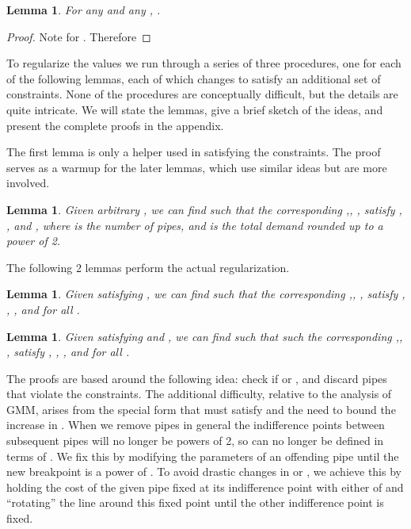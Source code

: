 \documentclass[11pt]{article}
\newtheorem{lem}[thm]{Lemma}
\begin{document}
\begin{lem}  For any  and any , .
\label{L_term_lem}
\end{lem}

\begin{proof}
Note  for .  Therefore 

\end{proof}

To regularize the values we run  through a series of three procedures, one for each of the following lemmas, 
each of which changes  to satisfy an additional set of constraints.  None of the procedures are conceptually difficult, but the details are quite intricate.  We will state the lemmas, give a brief sketch of the ideas, and present the complete proofs in the appendix.

The first lemma is only a helper used in satisfying the  constraints.  The proof serves as a warmup for the later lemmas, which use similar ideas but are more involved.

\begin{lem} 
\label{max_capacity_lem}
Given arbitrary , we can find  such that the corresponding ,, ,  satisfy , , and , where  is the number of pipes, and  is the total demand rounded up to a power of 2.
\end{lem}

The following 2 lemmas perform the actual regularization.

\begin{lem} 
\label{delta_lem}
Given  satisfying , we can find  
such that the corresponding ,, ,  satisfy
, , , and  for all .
\end{lem}

\begin{lem} 
\label{sigmalem}
Given  satisfying  and ,
we can find  such that such the corresponding ,, ,  satisfy
, , , and  for all .
\end{lem}

The proofs are based around the following idea: check if  or , and discard pipes that violate the constraints.  The additional difficulty, relative to the analysis of GMM, arises from the special form that  must satisfy and the need to bound the increase in .  When we remove pipes in general the indifference points between subsequent pipes will no longer be powers of 2, so  can no longer be defined in terms of .  We fix this by modifying the parameters of an offending pipe until the new breakpoint is a power of .  To avoid drastic changes in  or , we achieve this by holding the cost of the given pipe  fixed at its indifference point with either  of  and ``rotating'' the line  around this fixed point until the other indifference point is fixed.
\end{document}
